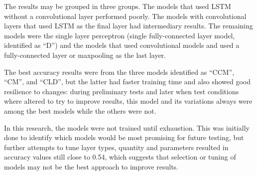 The results may be grouped in three groups. The models that used LSTM without a convolutional layer performed poorly. The models with convolutional layers that used LSTM as the final layer had intermediary results. The remaining models were the single layer perceptron (single fully-connected layer model, identified as ``D'') and the models that used convolutional models and used a fully-connected layer or maxpooling as the last layer.

The best accuracy results were from the three models identified as ``CCM'', ``CM'', and ``CLD'', but the latter had faster training time and also showed good resilience to changes: during preliminary tests and later when test conditions where altered to try to improve results, this model and its variations always were among the best models while the others were not.

In this research, the models were not trained until exhaustion. This was initially done to identify which models would be most promising for future testing, but further attempts to tune layer types, quantity and parameters resulted in accuracy values still close to 0.54, which suggests that selection or tuning of models may not be the best approach to improve results.





